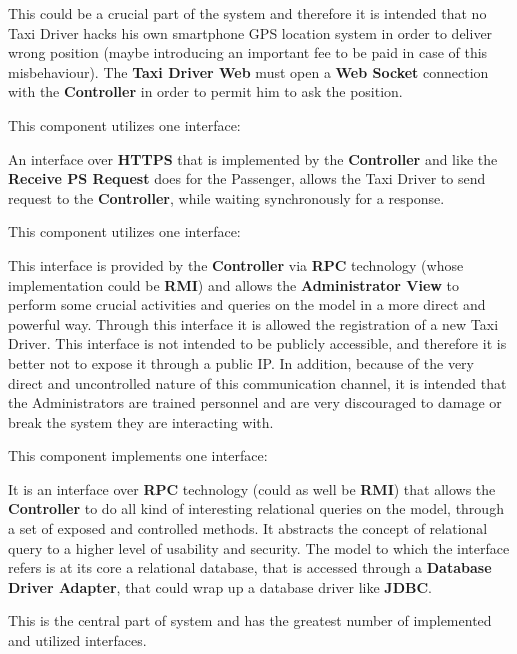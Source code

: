 \begin{itemize}
\begin{itemize}
		This could be a crucial part of the system and therefore it is intended that no Taxi Driver hacks his own smartphone GPS location system in order to deliver wrong position (maybe introducing an important fee to be paid in case of this misbehaviour).
		The \textbf{Taxi Driver Web} must open a \textbf{Web Socket} connection with the \textbf{Controller} in order to permit him to ask the position.
	\end{itemize}
	This component utilizes one interface:
	\begin{itemize}
		 An interface over \textbf{HTTPS} that is implemented by the \textbf{Controller} and like the \textbf{Receive PS Request} does for the Passenger, allows the Taxi Driver to send request to the \textbf{Controller}, while waiting synchronously for a response.
	\end{itemize}
	\itemBold{Administration View}
	This component utilizes one interface:
	\begin{itemize}
		 This interface is provided by the \textbf{Controller} via \textbf{RPC} technology (whose implementation could be \textbf{RMI}) and allows the \textbf{Administrator View} to perform some crucial activities and queries on the \myTaxiService{} model in a more direct and powerful way. Through this interface it is allowed the registration of a new Taxi Driver.
		This interface is not intended to be publicly accessible, and therefore it is better not to expose it through a public IP.
		In addition, because of the very direct and uncontrolled nature of this communication channel, it is intended that the Administrators are trained personnel and are very discouraged to damage or break the system they are interacting with.
	\end{itemize}
	\itemBold{Model}
	This component implements one interface:
	\begin{itemize}
		 It is an interface over \textbf{RPC} technology (could as well be \textbf{RMI}) that allows the \textbf{Controller} to do all kind of interesting relational queries on the \myTaxiService{} model, through a set of exposed and controlled methods.
		It abstracts the concept of relational query to a higher level of usability and security.
		The model to which the interface refers is at its core a relational database, that is accessed through a \textbf{Database Driver Adapter}, that could wrap up a database driver like \textbf{JDBC}.
	\end{itemize}
	\itemBold{Controller}
	This is the central part of \myTaxiService{} system and has the greatest number of implemented and utilized interfaces.

\end{itemize}
